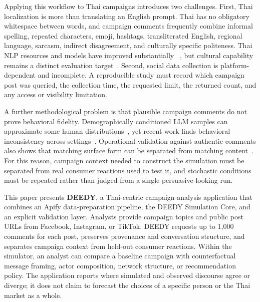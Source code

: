 \documentclass[conference]{IEEEtran}
\begin{document}
Applying this workflow to Thai campaigns introduces two challenges. First,
Thai localization is more than translating an English prompt. Thai has no
obligatory whitespace between words, and campaign comments frequently combine
informal spelling, repeated characters, emoji, hashtags, transliterated
English, regional language, sarcasm, indirect disagreement, and culturally
specific politeness. Thai NLP resources and models have improved substantially
~\cite{arreerard2022survey,phatthiyaphaibun2023pythainlp,
lowphansirikul2021wangchanberta,pipatanakul2024typhoon2}, but cultural capability
remains a distinct evaluation target~\cite{kim2025thaicli}. Second, social data
collection is platform-dependent and incomplete. A reproducible study must
record which campaign post was queried, the collection time, the requested
limit, the returned count, and any access or visibility limitation.

A further methodological problem is that plausible campaign comments do not
prove behavioral fidelity. Demographically conditioned LLM samples can
approximate some human distributions~\cite{argyle2023out}, yet recent work finds
behavioral inconsistency across settings~\cite{mooney2025coherent}. Operational
validation against authentic comments also shows that matching surface form
can be separated from matching content~\cite{schwager2026conditioned}. For this
reason, campaign context needed to construct the simulation must be separated
from real consumer reactions used to test it, and stochastic conditions must
be repeated rather than judged from a single persuasive-looking run.

This paper presents \textbf{DEEDY}, a Thai-centric campaign-analysis
application that combines an Apify data-preparation pipeline, the DEEDY
Simulation Core,
and an explicit validation layer. Analysts provide campaign topics and public
post URLs from Facebook, Instagram, or TikTok. DEEDY requests up to 1,000
comments for each post, preserves provenance and conversation structure, and
separates campaign context from held-out consumer reactions. Within the
simulator, an analyst can compare a baseline campaign with counterfactual
message framing, actor composition, network structure, or recommendation
policy. The application reports where simulated and observed discourse agree
or diverge; it does not claim to forecast the choices of a specific person or
the Thai market as a whole.
\end{document}
